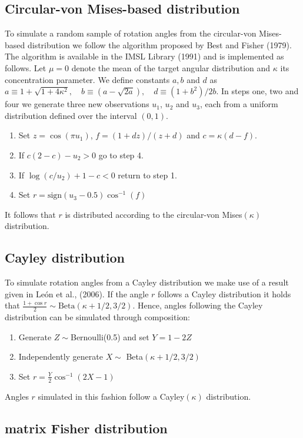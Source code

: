 \documentclass[12pt]{article}
\begin{document}
\subsection{Circular-von Mises-based distribution}

To simulate a random sample of rotation angles from the circular-von Mises-based distribution we follow the  algorithm proposed by Best and Fisher (1979).  The algorithm is available in the IMSL Library (1991) and is implemented as follows.  Let $\mu=0$ denote the mean of the target angular distribution and $\kappa$ its concentration parameter.  We define constants $a, b$ and $d$ as
$a\equiv 1+\sqrt{1+4\kappa^2},\quad b\equiv(a-\sqrt{2a}),\quad d\equiv(1+b^2)/2b.$
In steps one, two and four we generate three new observations $u_1$, $u_2$ and $u_3$,  each from a uniform distribution defined over the interval $(0,1)$. 
\begin{enumerate}
\item Set $z=\cos(\pi u_1)$, $f=(1+dz)/(z+d)$ and $c=\kappa(d-f)$.
\item If $c(2-c)-u_2>0$ go to step 4.
\item If $\log(c/u_2)+1-c<0$ return to step 1.
\item Set $r=\text{sign}(u_3-0.5)\cos^{-1}(f)$
\end{enumerate}
It follows that  $r$ is distributed according to the circular-von Mises$(\kappa)$ distribution.

\subsection{Cayley distribution}%

To simulate rotation angles from a Cayley distribution we make use of a result given in Le{\'o}n et al., (2006). If the angle $r$ follows a Cayley distribution it holds that $\frac{1+\cos r}{2} \sim \text{Beta}(\kappa+1/2, 3/2)$.  Hence, angles following the Cayley distribution can be simulated through composition: 
\begin{enumerate}
\item Generate $Z\sim$Bernoulli(0.5) and set  $Y=1-2Z$
\item Independently generate $X\sim$ Beta$(\kappa+1/2, 3/2)$
\item Set $r= \frac{Y}{2}\cos^{-1}(2X-1)$
\end{enumerate}
Angles $r$ simulated in this fashion follow a Cayley$(\kappa)$ distribution.

\subsection{matrix Fisher distribution}%
\end{document}
